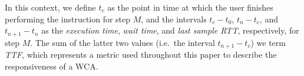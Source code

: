 In this context, we define \( t_c \) as the point in time at which the user finishes performing the instruction for step \( M \), and the intervals \( t_c - t_0 \), \( t_n - t_c \), and \( t_{n + 1} - t_n \) as the \emph{execution time}, \emph{wait time}, and \emph{last sample \gls{RTT}}, respectively, for step \( M \).
The sum of the latter two values (i.e.\ the interval \( t_{n + 1} - t_c \)) we term \emph{\gls{TTF}}, which represents a metric used throughout this paper to describe the responsiveness of a \gls{WCA}.


